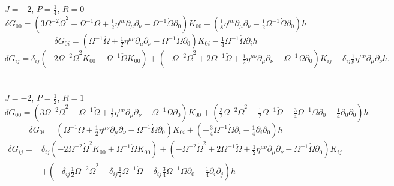 \documentclass[10pt,letterpaper]{article}
\begin{document}
\\ \\
$J=-2$, $P=\tfrac14$, $R=0$
\begin{equation}
\delta G_{00}=
(3 \Omega^{-2} \dot{\Omega}^2 -  \Omega^{-1} \ddot{\Omega} + \tfrac{1}{2} \eta^{\mu \nu} \partial_{\mu} \partial_{\nu} -  \Omega^{-1} \dot{\Omega} \partial_{0}) K_{00} + (\tfrac{1}{8} \eta^{\mu \nu} \partial_{\mu} \partial_{\nu} -  \tfrac{1}{2} \Omega^{-1} \dot{\Omega} \partial_{0}) h
\end{equation}
\begin{equation}
\delta G_{0i}=
(\Omega^{-1} \ddot{\Omega} + \tfrac{1}{2} \eta^{\mu \nu} \partial_{\mu} \partial_{\nu} -  \Omega^{-1} \dot{\Omega} \partial_{0}) K_{0i} -  \tfrac{1}{4} \Omega^{-1} \dot{\Omega} \partial_{i} h
\end{equation}
\begin{equation}
\delta G_{ij}=
\delta_{ij}(-2 \Omega^{-2} \dot{\Omega}^2 K_{00} + \Omega^{-1} \ddot{\Omega} K_{00}) + (- \Omega^{-2} \dot{\Omega}^2 + 2 \Omega^{-1} \ddot{\Omega} + \tfrac{1}{2} \eta^{\mu \nu} \partial_{\mu} \partial_{\nu} -  \Omega^{-1} \dot{\Omega} \partial_{0}) K_{ij} - 
\delta_{ij} \tfrac{1}{8} \eta^{\mu \nu} \partial_{\mu} \partial_{\nu} h.
\end{equation}
\\ \\
$J=-2$, $P=\tfrac12$, $R=1$
\begin{equation}
\delta G_{00}=
(3 \Omega^{-2} \dot{\Omega}^2 -  \Omega^{-1} \ddot{\Omega} + \tfrac{1}{2} \eta^{\mu \nu} \partial_{\mu} \partial_{\nu} -  \Omega^{-1} \dot{\Omega} \partial_{0}) K_{00} + (\tfrac{3}{2} \Omega^{-2} \dot{\Omega}^2 -  \tfrac{1}{2} \Omega^{-1} \ddot{\Omega} -  \tfrac{3}{4} \Omega^{-1} \dot{\Omega} \partial_{0} -  \tfrac{1}{4} \partial_{0} \partial_{0}) h
\end{equation}
\begin{equation}
\delta G_{0i}=
(\Omega^{-1} \ddot{\Omega} + \tfrac{1}{2} \eta^{\mu \nu} \partial_{\mu} \partial_{\nu} -  \Omega^{-1} \dot{\Omega} \partial_{0}) K_{0i} + (- \tfrac{3}{4} \Omega^{-1} \dot{\Omega} \partial_{i} -  \tfrac{1}{4} \partial_{i} \partial_{0}) h
\end{equation}
\begin{align}
\delta G_{ij}={}&
\delta_{ij}(-2 \Omega^{-2} \dot{\Omega}^2 K_{00} + \Omega^{-1} \ddot{\Omega} K_{00}) + (- \Omega^{-2} \dot{\Omega}^2 + 2 \Omega^{-1} \ddot{\Omega} + \tfrac{1}{2} \eta^{\mu \nu} \partial_{\mu} \partial_{\nu} -  \Omega^{-1} \dot{\Omega} \partial_{0}) K_{ij}\nonumber \\
& + (- \delta_{ij}\tfrac{1}{2} \Omega^{-2} \dot{\Omega}^2 -  \delta_{ij}\tfrac{1}{2} \Omega^{-1} \ddot{\Omega} -  \delta_{ij}\tfrac{3}{4} \Omega^{-1} \dot{\Omega} \partial_{0} -  \tfrac{1}{4} \partial_{i} \partial_{j}) h
\end{align}
\end{document}
